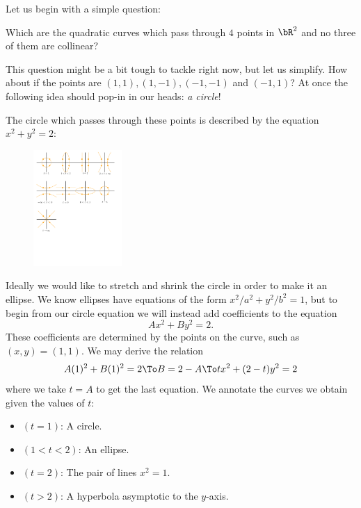 \documentclass[12pt]{memoir}
\begin{document}
Let us begin with a simple question:
\begin{significant}
Which are the quadratic curves which pass through $4$ points in $\bR^2$ and no three of them are collinear?
\end{significant}
This question might be a bit tough to tackle right now, but let us simplify. How about if the points are $(1,1),(1,-1),(-1,-1)$ and $(-1,1)$? At once the following idea should pop-in in our heads: \emph{a circle}!\par 
The circle which passes through these points is described by the equation $x^2+y^2=2$:\par
\begin{figure}[h]
    \centering
    \includegraphics[width=0.3\textwidth, trim= 0.8cm 22.9cm 16cm 0.6cm,clip]{fig1.pdf}
\end{figure}
Ideally we would like to stretch and shrink the circle in order to make it an ellipse. We know ellipses have equations of the form $x^2/a^2+y^2/b^2=1$, but to begin from our circle equation we will instead add coefficients to the equation 
$$Ax^2+By^2=2.$$
These coefficients are determined by the points on the curve, such as $(x,y)=(1,1)$. We may derive the relation 
$$A(1)^2+B(1)^2=2\To B=2-A\To tx^2+(2-t)y^2=2$$
where we take $t=A$ to get the last equation.
We annotate the curves we obtain given the values of $t$:
\vspace{-0.5em}
\begin{itemize}
    \itemsep=-0.4em
    \item $(t=1)$: A circle.
    \item $(1<t<2)$: An ellipse.
    \item $(t=2)$: The pair of lines $x^2=1$.
    \item $(t>2)$: A hyperbola asymptotic to the $y$-axis.
\end{itemize}
\end{document}
